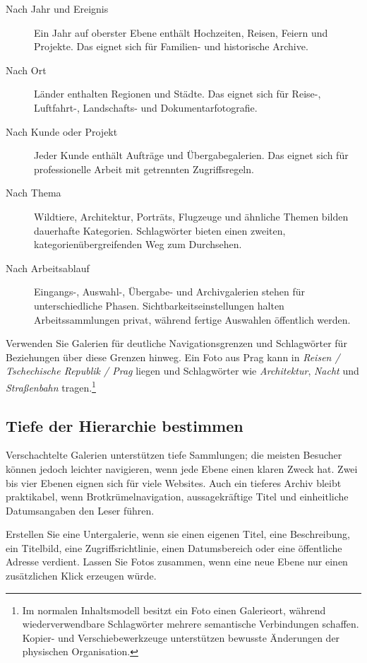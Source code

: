 \documentclass[11pt,a4paper]{article}
\begin{document}
\begin{description}
  \item[Nach Jahr und Ereignis] Ein Jahr auf oberster Ebene enthält Hochzeiten,
  Reisen, Feiern und Projekte. Das eignet sich für Familien- und historische
  Archive.
  \item[Nach Ort] Länder enthalten Regionen und Städte. Das eignet sich für
  Reise-, Luftfahrt-, Landschafts- und Dokumentarfotografie.
  \item[Nach Kunde oder Projekt] Jeder Kunde enthält Aufträge und
  Übergabegalerien. Das eignet sich für professionelle Arbeit mit getrennten
  Zugriffsregeln.
  \item[Nach Thema] Wildtiere, Architektur, Porträts, Flugzeuge und ähnliche
  Themen bilden dauerhafte Kategorien. Schlagwörter bieten einen zweiten,
  kategorienübergreifenden Weg zum Durchsehen.
  \item[Nach Arbeitsablauf] Eingangs-, Auswahl-, Übergabe- und Archivgalerien
  stehen für unterschiedliche Phasen. Sichtbarkeitseinstellungen halten
  Arbeitssammlungen privat, während fertige Auswahlen öffentlich werden.
\end{description}

Verwenden Sie Galerien für deutliche Navigationsgrenzen und Schlagwörter für
Beziehungen über diese Grenzen hinweg. Ein Foto aus Prag kann in \emph{Reisen /
Tschechische Republik / Prag} liegen und Schlagwörter wie \emph{Architektur},
\emph{Nacht} und \emph{Straßenbahn} tragen.\footnote{Im normalen Inhaltsmodell
besitzt ein Foto einen Galerieort, während wiederverwendbare Schlagwörter
mehrere semantische Verbindungen schaffen. Kopier- und Verschiebewerkzeuge
unterstützen bewusste Änderungen der physischen Organisation.}

\subsection{Tiefe der Hierarchie bestimmen}

Verschachtelte Galerien unterstützen tiefe Sammlungen; die meisten Besucher
können jedoch leichter navigieren, wenn jede Ebene einen klaren Zweck hat. Zwei
bis vier Ebenen eignen sich für viele Websites. Auch ein tieferes Archiv bleibt
praktikabel, wenn Brotkrümelnavigation, aussagekräftige Titel und einheitliche
Datumsangaben den Leser führen.

Erstellen Sie eine Untergalerie, wenn sie einen eigenen Titel, eine
Beschreibung, ein Titelbild, eine Zugriffsrichtlinie, einen Datumsbereich oder
eine öffentliche Adresse verdient. Lassen Sie Fotos zusammen, wenn eine neue
Ebene nur einen zusätzlichen Klick erzeugen würde.
\end{document}
